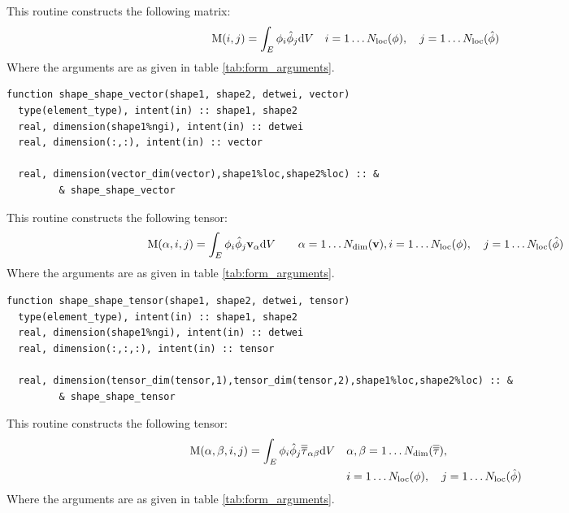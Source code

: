 \documentclass[a4paper, 11pt]{book}
\begin{document}
This routine constructs the following matrix:
\begin{equation}
  \mathrm{M}(i,j)=\int_E \phi_{i}\hat{\phi}_{j}\mathrm{d} V\quad
  i=1\ldots N_\mathrm{loc}(\phi),\quad j=1\ldots N_\mathrm{loc}(\hat{\phi}) 
\end{equation}
Where the arguments are as given in table \ref{tab:form_arguments}.


\begin{lstlisting}
function shape_shape_vector(shape1, shape2, detwei, vector)
  type(element_type), intent(in) :: shape1, shape2
  real, dimension(shape1%ngi), intent(in) :: detwei
  real, dimension(:,:), intent(in) :: vector

  real, dimension(vector_dim(vector),shape1%loc,shape2%loc) :: &
         & shape_shape_vector
\end{lstlisting}

This routine constructs the following tensor:
\begin{equation}
  \mathrm{M}(\alpha,i,j)=\int_E \phi_{i}\hat{\phi}_{j}\mathbf{v}_\alpha\mathrm{d} V\quad
  \quad \alpha=1\ldots N_\mathrm{dim}(\mathbf{v}),i=1\ldots N_\mathrm{loc}(\phi),\quad j=1\ldots N_\mathrm{loc}(\hat{\phi})
\end{equation}
Where the arguments are as given in table \ref{tab:form_arguments}.


\begin{lstlisting}
function shape_shape_tensor(shape1, shape2, detwei, tensor) 
  type(element_type), intent(in) :: shape1, shape2 
  real, dimension(shape1%ngi), intent(in) :: detwei
  real, dimension(:,:,:), intent(in) :: tensor

  real, dimension(tensor_dim(tensor,1),tensor_dim(tensor,2),shape1%loc,shape2%loc) :: &
         & shape_shape_tensor
\end{lstlisting}


This routine constructs the following tensor:
\begin{equation}
  \begin{split}
    \mathrm{M}(\alpha,\beta,i,j)=\int_E \phi_{i}\hat{\phi}_{j}\overline{\overline{\tau}}_{\alpha\beta}\mathrm{d} V\quad
    &\alpha,\beta=1\ldots N_\mathrm{dim}(\overline{\overline{\tau}}),\\
    &i=1\ldots N_\mathrm{loc}(\phi),\quad j=1\ldots N_\mathrm{loc}(\hat{\phi})   
  \end{split}
\end{equation}
Where the arguments are as given in table \ref{tab:form_arguments}.
\end{document}
